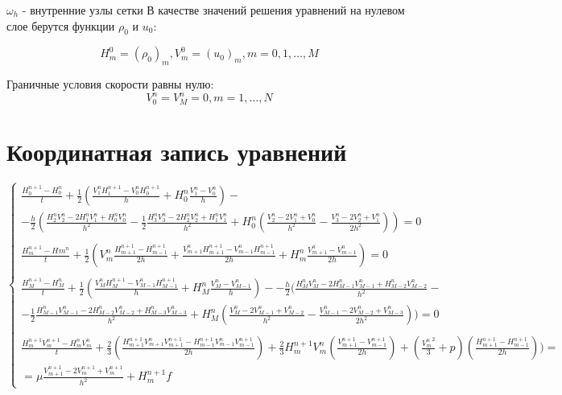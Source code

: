\documentclass[a4paper, 12pt]{article}
\begin{document}
\(\omega_{h}\) - внутренние узлы сетки 
В качестве значений решения уравнений на нулевом слое берутся функции \(\rho_{0}\) и \(u_{0}\):

    $$ H^{0}_{m} = (\rho_{0})_{m},  V^{0}_{m} = (u_{0})_{m},        m=0,1,\dots,M$$

Граничные условия скорости равны нулю:
$$ V^{n}_{0} =  V^{n}_{M} = 0,    m=1,\dots,N $$

\section{Координатная запись уравнений}
\begin{equation*}
\begin{cases}
\frac{H_{0}^{n+1}-H_{0}^{n}}{t}+\frac{1}{2}(\frac{V_{1}^{n}H_{1}^{n+1}-V_{0}^{n}H_{0}^{n+1}}{h}+H_{0}^{n}\frac{V_{1}^{n}-V_{0}^{n}}{h})-
\\
-\frac{h}{2} (\frac{H_{2}^{n}V_{2}^{n}-2H_{1}^{n}V_{1}^{n}+H_{0}^{n}V_{0}^{n}}{h^{2}}-\frac{1}{2}\frac{H_{3}^{n}V_{3}^{n}-2H_{2}^{n}V_{2}^{n}+H_{1}^{n}V_{1}^{n}}{h^{2}}+H_{0}^{n}(\frac{V_{2}^{n}-2V_{1}^{n}+V_{0}^{n}}{h^2}-\frac{V_{3}^{n}-2V_{2}^{n}+V_{1}^{n}}{2h^{2}}))=0
\\
\\
\frac{H_{m}^{n+1}-H_{}m^{n}}{t}+\frac{1}{2}(V_{m}^{n}\frac{H_{m+1}^{n+1}-H_{m-1}^{n+1}}{2h}+\frac{V_{m+1}^{n}H_{m+1}^{n+1}-V_{m-1}^{n}H_{m-1}^{n+1}}{2h}+H_{m}^{n}\frac{V_{m+1}^{n}-V_{m-1}^{n}}{2h})=0
\\
\\
 \frac{H_{M}^{n+1}-H_{M}^{n}}{t}+\frac{1}{2}(\frac{V_{M}^{n}H_{M}^{n+1}-V_{M-1}^{n}H_{M-1}^{n+1}}{h}+H_{M}^{n}\frac{V_{M}^{n}-V_{M-1}^{n}}{h})-
-\frac{h}{2} (\frac{H_{M}^{n}V_{M}^{n}-2H_{M-1}^{n}V_{M-1}^{n}+H_{M-2}^{n}V_{M-2}^{n}}{h^{2}}- \\-\frac{1}{2}\frac{H_{M-1}^{n}V_{M-1}^{n}-2H_{M-2}^{n}V_{M-2}^{n}+H_{M-3}^{n}V_{M-3}^{n}}{h^{2}}+H_{M}^{n}(\frac{V_{M}^{n}-2V_{M-1}^{n}+V_{M-2}^{n}}{h^2}-\frac{V_{M-1}^{n}-2V_{M-2}^{n}+V_{M-3}^{n}}{2h^{2}}))=0
\\
\\
\frac{H_{m}^{n+1}V_{m}^{n+1}-H_{m}^{n}V_{m}^{n}}{t}
+\frac{2}{3}(\frac{H_{m+1}^{n+1} V_{m+1}^{n} V_{m+1}^{n+1} 
                    - H_{m-1}^{n+1} V_{m-1}^{n} V_{m-1}^{n+1}} 
                  {2h})
+\frac{2}{3}H_{m}^{n+1} V_{m}^{n} (\frac{V_{m+1}^{n+1} - V_{m-1}^{n+1}} 
                                         {2h})
+ (\frac{{V_{m}^{n}}^{2}}{3} + p)  (\frac{H_{m+1}^{n+1} - H_{m-1}^{n+1}} 
                                         {2h}))
                  
=
\\=\mu\frac{V_{m+1}^{n+1} - 2 V_{m}^{n+1} + V_{m}^{n+1}}{h^{2}} + H_{m}^{n+1}f
\end{cases}
\end{equation*}
\end{document}
